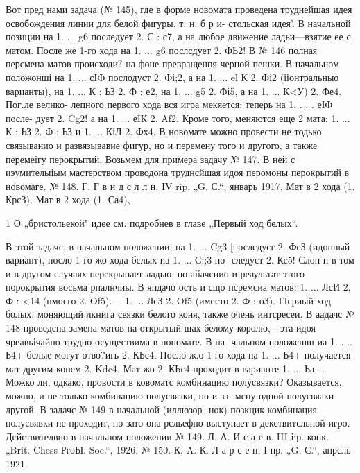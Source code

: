 {    Вот пред нами задача (№ 145), где в форме новомата проведена труднейшая идея освобождения линии для белой фигуры, т. н. б р и- стольская идея'. В начальной позиции на 1. ... g6 последует 2. С : с7, а на любое движение ладьи—взятие ее с матом. После же 1-го хода на 1. ... g6 послсдует 2. ФЬ2!
    В № 146 полная персмена матов происходи? на фоне превращенпя черной пешки. В начальном положонші на 1. ... сІФ послодуст 2. Фі;2, а на 1. ... el К 2. Фі2 (ііонтральныо варианты), на 1. ... К : ЬЗ
2. Ф : е2, на 1. ... g5 2. Фі5, а на 1. ... К<У) 2. Фе4. Пог.ле велнко- лепного первого хода вся игра мекяется: теперь на 1. . . . еІФ после- дует 2. Cg2! а на 1. ... еІК 2. Af2. Кроме того, меняются еще 2 мата:
1. ... К : ЬЗ 2. Ф : ЬЗ и 1. ... КіЛ 2. Фх4.
    В новомате можно провести не тодько связыванио и развязывавие фигур, но и перемену того и другого, а также перемеігу перокрытий. Возьмем для примера задачу № 147. В ней с иэумителыіым мастерством проводона труднсйшая идоя перомоны перокрытий в новомаге.
№ 148. Г. Г в н д с л л н.
IV rip. „G. С.“, январь 1917.
Мат в 2 хода (1. КрсЗ).	Мат в 2 хода (1. Са4),

1 О „бристольекой" идее см. подробнев в главе „Первый ход белых“.

    В этой задачс, в начальном положснии, на 1. ... Cg3 [послсдусг
2. ФеЗ (идонный вариант), посло 1-го жо хода бслых на 1. ... С;;3 но- следуст 2. Кс5! Слон н в том и в другом случаях перекрыпает ладыо, по аііачснио и реаультат этого порокрытия восьма рпалнчиы. В япдачо ость и сщо псремсиа матов: 1. ... ЛсИ 2, Ф : <14 (пмосго 2. Of5).—
1. ... ЛсЗ 2. Of5 (иместо 2. Ф : оЗ). ГІсриый ход болых, моняющий лкнига связки белого коня, также очень интсресеи.
    В аадачс № 148 проведсна замена матов на открытый шах белому королю,—эта идоя чреавьічайно трудно осуществима в нопомате. В на- чальном положсшш иа 1. . .. Ь4+ бслые могут отво?игь 2. КЬс4. Посло ж.о 1-го хода на 1. ... Ь4+ получается мат другим конем 2. Kdc4. Мат жо
2. КЬс4 проходит в варианте 1. ... Ьа+.
Можко ли, одкако, провости в ковоматс комбинацию полусвязки? Оказывается, можно, и не только комбинацию полусвязки, но и за- мсну одной полусвяаки другой. В задачс № 149 в начальной (иллюзор- нок) позкцик комбинация полусвявки не проходит, но зато она рсльефно выступает в декетвитсльной игро. Дсйствителвно в начальном положении
№ 149. Л. А. И с а е в.
III і;р. конк. „Brit. Chess РгоЫ. Soc.“, 1926.
	№ 150. К, A. К. Л а р с е н. 
I пр. „G. С.“, апрсль 1921.


}
